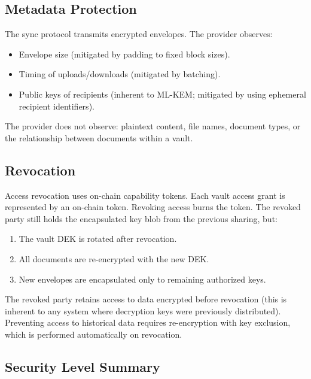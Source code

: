 \documentclass[11pt,a4paper]{article}
\begin{document}
\subsection{Metadata Protection}

The sync protocol transmits encrypted envelopes.  The provider observes:
\begin{itemize}[nosep]
  \item Envelope size (mitigated by padding to fixed block sizes).
  \item Timing of uploads/downloads (mitigated by batching).
  \item Public keys of recipients (inherent to ML-KEM; mitigated by
        using ephemeral recipient identifiers).
\end{itemize}

The provider does not observe: plaintext content, file names, document
types, or the relationship between documents within a vault.

\subsection{Revocation}

Access revocation uses on-chain capability tokens.  Each vault access
grant is represented by an on-chain token.  Revoking access burns the
token.  The revoked party still holds the encapsulated key blob from
the previous sharing, but:
\begin{enumerate}[nosep]
  \item The vault DEK is rotated after revocation.
  \item All documents are re-encrypted with the new DEK.
  \item New envelopes are encapsulated only to remaining authorized keys.
\end{enumerate}

The revoked party retains access to data encrypted before revocation
(this is inherent to any system where decryption keys were previously
distributed).  Preventing access to historical data requires re-encryption
with key exclusion, which is performed automatically on revocation.

\subsection{Security Level Summary}
\end{document}
